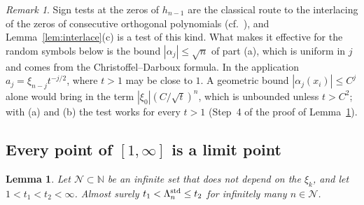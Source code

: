\documentclass[11pt]{amsart}
\newtheorem{lemma}[theorem]{Lemma}
\theoremstyle{definition}
\theoremstyle{remark}
\newtheorem{remark}[theorem]{Remark}
\numberwithin{equation}{section}
\newcommand{\N}{\mathbb{N}}
\begin{document}
\begin{remark}\label{rem:interlace}
Sign tests at the zeros of $h_{n-1}$ are the classical route to the interlacing of the zeros of consecutive orthogonal polynomials (cf.\ \cite[Section~3.3, Theorem~3.3.2]{Sz}), and Lemma~\ref{lem:interlace}(c) is a test of this kind. What makes it effective for the random symbols below is the bound $|\alpha_j|\le\sqrt n$ of part (a), which is uniform in $j$ and comes from the Christoffel--Darboux formula. In the application $a_j=\xi_{n-j}t^{-j/2}$, where $t>1$ may be close to $1$. A geometric bound $|\alpha_j(x_i)|\le C^j$ alone would bring in the term $|\xi_0|(C/\sqrt t)^n$, which is unbounded unless $t>C^2$; with (a) and (b) the test works for every $t>1$ (Step~4 of the proof of Lemma~\ref{lem:std-planted}).
\end{remark}

\subsection{Every point of \texorpdfstring{$[1,\infty]$}{[1,infinity]} is a limit point}

\begin{lemma}\label{lem:std-planted}
Let $\mathcal N\subset\N$ be an infinite set that does not depend on the $\xi_k$, and let $1<t_1<t_2<\infty$. Almost surely $t_1<\Lambda_n^{\rm std}\le t_2$ for infinitely many $n\in\mathcal N$.
\end{lemma}
\end{document}
